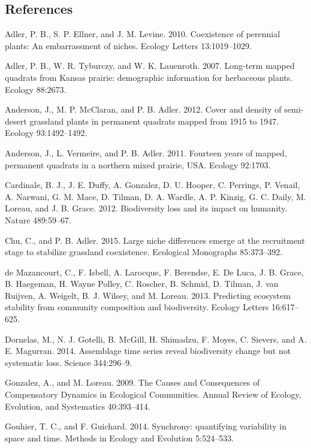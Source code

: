 \documentclass[12pt,]{article}
\begin{document}
\pagebreak{}

\subsection*{References}\label{references}

Adler, P. B., S. P. Ellner, and J. M. Levine. 2010. Coexistence of
perennial plants: An embarrassment of niches. Ecology Letters
13:1019--1029.

Adler, P. B., W. R. Tyburczy, and W. K. Lauenroth. 2007. Long-term
mapped quadrats from Kansas prairie: demographic information for
herbaceous plants. Ecology 88:2673.

Anderson, J., M. P. McClaran, and P. B. Adler. 2012. Cover and density
of semi-desert grassland plants in permanent quadrats mapped from 1915
to 1947. Ecology 93:1492--1492.

Anderson, J., L. Vermeire, and P. B. Adler. 2011. Fourteen years of
mapped, permanent quadrats in a northern mixed prairie, USA. Ecology
92:1703.

Cardinale, B. J., J. E. Duffy, A. Gonzalez, D. U. Hooper, C. Perrings,
P. Venail, A. Narwani, G. M. Mace, D. Tilman, D. A. Wardle, A. P.
Kinzig, G. C. Daily, M. Loreau, and J. B. Grace. 2012. Biodiversity loss
and its impact on humanity. Nature 489:59--67.

Chu, C., and P. B. Adler. 2015. Large niche differences emerge at the
recruitment stage to stabilize grassland coexistence. Ecological
Monographs 85:373--392.

{{de Mazancourt}}, C., F. Isbell, A. Larocque, F. Berendse, E. {De
Luca}, J. B. Grace, B. Haegeman, H. {Wayne Polley}, C. Roscher, B.
Schmid, D. Tilman, J. van Ruijven, A. Weigelt, B. J. Wilsey, and M.
Loreau. 2013. Predicting ecosystem stability from community composition
and biodiversity. Ecology Letters 16:617--625.

Dornelas, M., N. J. Gotelli, B. McGill, H. Shimadzu, F. Moyes, C.
Sievers, and A. E. Magurran. 2014. Assemblage time series reveal
biodiversity change but not systematic loss. Science 344:296--9.

Gonzalez, A., and M. Loreau. 2009. The Causes and Consequences of
Compensatory Dynamics in Ecological Communities. Annual Review of
Ecology, Evolution, and Systematics 40:393--414.

Gouhier, T. C., and F. Guichard. 2014. Synchrony: quantifying
variability in space and time. Methods in Ecology and Evolution
5:524--533.
\end{document}
